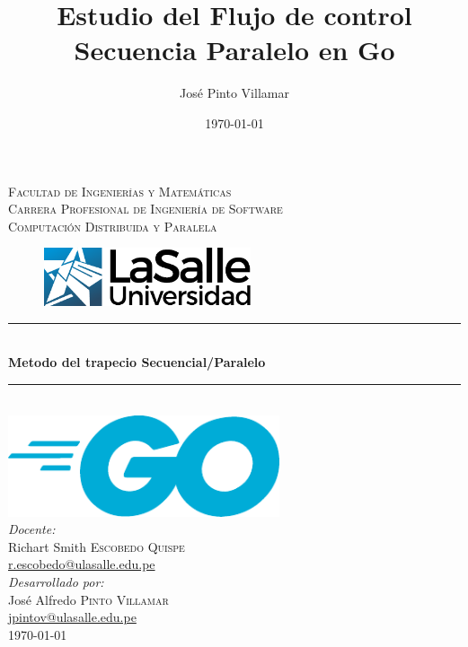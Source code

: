 \documentclass[a4paper]{article}
\title{Estudio del Flujo de control Secuencia Paralelo en Go}					                                %
\author{José Pinto Villamar}				                                                                              	%
\date{\today}					                                                                        	%
\newcommand{\HRule}{\rule{\linewidth}{0.5mm}}
\begin{document}
\graphicspath{{./images/}}

%

\begin{titlepage}
    \centering
    
    \textsc{\Large Facultad de Ingenierías y Matemáticas}\\[0.2cm]
    \textsc{\Large Carrera Profesional de Ingeniería de Software}\\[0.2cm]
    \textsc{\Large Computación Distribuida y Paralela}\\[0.5cm]
    
    \centering
        \vspace*{0.0 cm}
        \begin{figure}
            \centering
            \hspace{1cm}
            \includegraphics[height = 65px]{logo-la-salle.pdf}
        \end{figure}
    
    \HRule{} \\[0.5cm]
    { \LARGE \bfseries Metodo del trapecio Secuencial/Paralelo}\\[0.3cm]
    \HRule{} \\[0.5cm]
    
    \includegraphics[width = 0.6\textwidth]{Go_Logo_Blue.pdf}\\[0.5cm]

    \Large \emph{Docente:}\\
    Richart Smith \textsc{Escobedo Quispe}\\
    \href{mailto:r.escobedo@ulasalle.edu.pe}{r.escobedo@ulasalle.edu.pe}\\[0.5cm]
    
    \Large \emph{Desarrollado por:}\\
    José Alfredo \textsc{Pinto Villamar}\\
    \href{mailto:jpintov@ulasalle.edu.pe}{jpintov@ulasalle.edu.pe}\\[0.5cm]
    
    {\large \today}\\[2cm]
    
    \end{titlepage}
\end{document}
